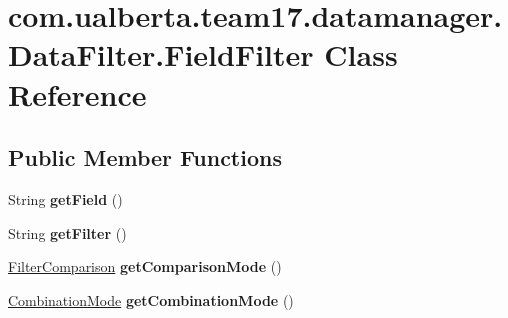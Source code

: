 \hypertarget{classcom_1_1ualberta_1_1team17_1_1datamanager_1_1_data_filter_1_1_field_filter}{\section{com.\+ualberta.\+team17.\+datamanager.\+Data\+Filter.\+Field\+Filter Class Reference}
\label{classcom_1_1ualberta_1_1team17_1_1datamanager_1_1_data_filter_1_1_field_filter}
}
\subsection*{Public Member Functions}
\begin{DoxyCompactItemize}
\item 
\hypertarget{classcom_1_1ualberta_1_1team17_1_1datamanager_1_1_data_filter_1_1_field_filter_a09378ec2487197ca353dff1f71e231ff}{String {\bfseries get\+Field} ()}\label{classcom_1_1ualberta_1_1team17_1_1datamanager_1_1_data_filter_1_1_field_filter_a09378ec2487197ca353dff1f71e231ff}

\item 
\hypertarget{classcom_1_1ualberta_1_1team17_1_1datamanager_1_1_data_filter_1_1_field_filter_a8cf0372089713e6c9653e698cfddcb58}{String {\bfseries get\+Filter} ()}\label{classcom_1_1ualberta_1_1team17_1_1datamanager_1_1_data_filter_1_1_field_filter_a8cf0372089713e6c9653e698cfddcb58}

\item 
\hypertarget{classcom_1_1ualberta_1_1team17_1_1datamanager_1_1_data_filter_1_1_field_filter_a744d481a747b4c3a4b10b0d7cf076f79}{\hyperlink{enumcom_1_1ualberta_1_1team17_1_1datamanager_1_1_data_filter_1_1_filter_comparison}{Filter\+Comparison} {\bfseries get\+Comparison\+Mode} ()}\label{classcom_1_1ualberta_1_1team17_1_1datamanager_1_1_data_filter_1_1_field_filter_a744d481a747b4c3a4b10b0d7cf076f79}

\item 
\hypertarget{classcom_1_1ualberta_1_1team17_1_1datamanager_1_1_data_filter_1_1_field_filter_aa190eb1b632c54469485a1581a794e22}{\hyperlink{enumcom_1_1ualberta_1_1team17_1_1datamanager_1_1_data_filter_1_1_combination_mode}{Combination\+Mode} {\bfseries get\+Combination\+Mode} ()}\label{classcom_1_1ualberta_1_1team17_1_1datamanager_1_1_data_filter_1_1_field_filter_aa190eb1b632c54469485a1581a794e22}

\end{DoxyCompactItemize}


